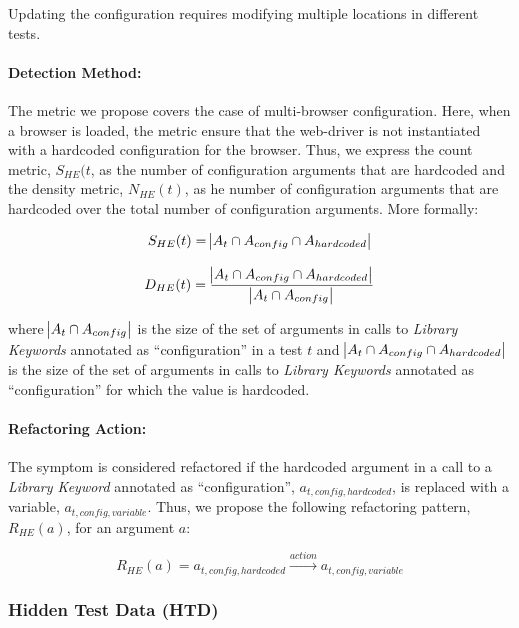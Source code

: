 Updating the configuration requires modifying multiple locations in different tests.

\paragraph{Detection Method:}

The metric we propose covers the case of multi-browser configuration. Here, when a browser is loaded, the metric ensure that the web-driver is not instantiated with a hardcoded configuration for the browser. Thus, we express the count metric, $S_{HE}(t$, as the number of configuration arguments that are hardcoded and the density metric, $N_{HE}(t)$, as he number of configuration arguments that are hardcoded over the total number of configuration arguments. More formally:

\begin{equation*}
    S_{HE}(t) = \abs{A_{t} \cap A_{config} \cap A_{hardcoded}}
\end{equation*}

\begin{equation*}
    D_{HE}(t) = \frac{\abs{A_{t} \cap A_{config} \cap A_{hardcoded}}}{\abs{A_{t} \cap A_{config}}}
\end{equation*}

where $\abs{A_{t} \cap A_{config}}$ is the size of the set of arguments in calls to \emph{Library Keywords} annotated as ``configuration'' in a test $t$ and $\abs{A_{t} \cap A_{config} \cap A_{hardcoded}}$ is the size of the set of arguments in calls to \emph{Library Keywords} annotated as ``configuration'' for which the value is hardcoded.

\paragraph{Refactoring Action:}

The symptom is considered refactored if the hardcoded argument in a call to a \emph{Library Keyword} annotated as ``configuration'', $a_{t, config, hardcoded}$, is replaced with a variable, $a_{t, config, variable}$. Thus, we propose the following refactoring pattern, $R_{HE}(a)$, for an argument $a$:

\begin{equation*}
    R_{HE}(a) = a_{t, config, hardcoded} \xrightarrow{action}  a_{t, config, variable}
\end{equation*}

\subsubsection{Hidden Test Data (HTD)}

